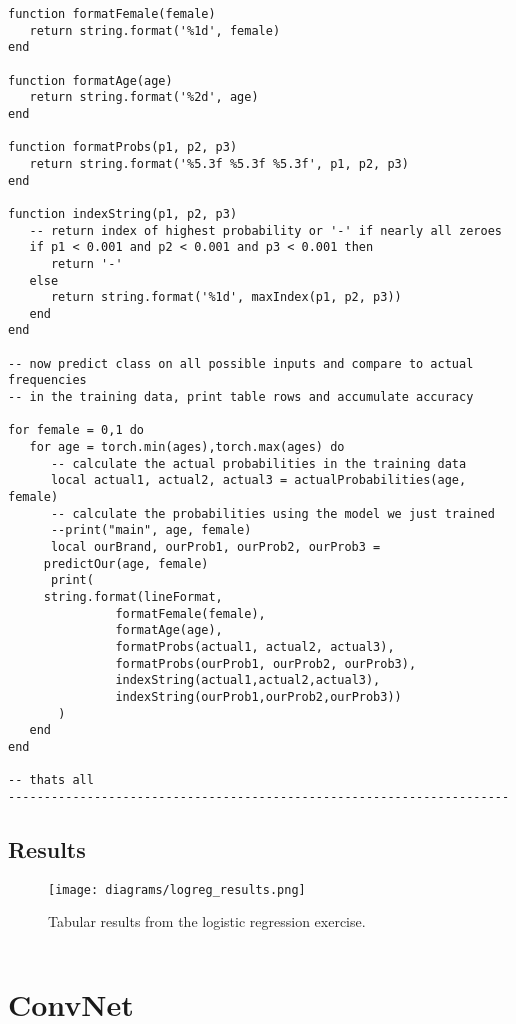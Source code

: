 \begin{verbatim}
function formatFemale(female)
   return string.format('%1d', female)
end

function formatAge(age)
   return string.format('%2d', age)
end

function formatProbs(p1, p2, p3)
   return string.format('%5.3f %5.3f %5.3f', p1, p2, p3)
end

function indexString(p1, p2, p3)
   -- return index of highest probability or '-' if nearly all zeroes
   if p1 < 0.001 and p2 < 0.001 and p3 < 0.001 then
      return '-'
   else 
      return string.format('%1d', maxIndex(p1, p2, p3))
   end
end

-- now predict class on all possible inputs and compare to actual frequencies
-- in the training data, print table rows and accumulate accuracy

for female = 0,1 do
   for age = torch.min(ages),torch.max(ages) do
      -- calculate the actual probabilities in the training data
      local actual1, actual2, actual3 = actualProbabilities(age, female)
      -- calculate the probabilities using the model we just trained
      --print("main", age, female)
      local ourBrand, ourProb1, ourProb2, ourProb3 = 
	 predictOur(age, female)
      print(
	 string.format(lineFormat,
		       formatFemale(female), 
		       formatAge(age),
		       formatProbs(actual1, actual2, actual3),
		       formatProbs(ourProb1, ourProb2, ourProb3),
		       indexString(actual1,actual2,actual3),
		       indexString(ourProb1,ourProb2,ourProb3))
	   )
   end
end

-- thats all
----------------------------------------------------------------------

\end{verbatim}
\clearpage

\subsection*{Results}

\begin{figure}[H]
\centering
\texttt{[image: diagrams/logreg\_results.png]}
\caption{Tabular results from the logistic regression exercise.}
\label{fig:logreg_results}
\end{figure}
\begin{verbatim}

\end{verbatim}
\clearpage

\section{ConvNet}
\label{app:convnet}

